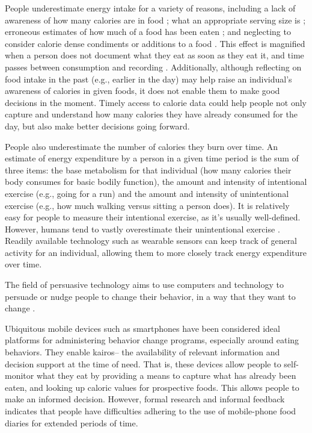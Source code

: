 People underestimate energy intake for a variety of reasons, including a lack of awareness of how many calories are in food \citep{Zegman1984}; what an appropriate serving size is \citep{Young2009, beasley_accuracy_2005}; erroneous estimates of how much of a food has been eaten \citep{beasley_accuracy_2005}; and neglecting to consider calorie dense condiments or additions to a food \citep{Zegman1984}. This effect is magnified when a person does not document what they eat as soon as they eat it, and time passes between consumption and recording \citep{Baranowski1994}. Additionally, although reflecting on food intake in the past (e.g., earlier in the day) may help raise an individual's awareness of calories in given foods, it does not enable them to make good decisions in the moment. Timely access to calorie data could help people not only capture and understand how many calories they have already consumed for the day, but also make better decisions going forward. 

People also underestimate the number of calories they burn over time. An estimate of energy expenditure by a person in a given time period is the sum of three items: the base metabolism for that individual (how many calories their body consumes for basic bodily function), the amount and intensity of intentional exercise (e.g., going for a run) and the amount and intensity of unintentional exercise (e.g., how much walking versus sitting a person does). It is relatively easy for people to measure their intentional exercise, as it's usually well-defined. However, humans tend to vastly overestimate their unintentional exercise \citep{Duncan2001}. Readily available technology such as wearable sensors can keep track of general activity for an individual, allowing them to more closely track energy expenditure over time. 

The field of persuasive technology aims to use computers and technology to persuade or nudge people to change their behavior, in a way that they want to change \citep{Fogg2002}. 

Ubiquitous mobile devices such as smartphones have been considered ideal platforms for administering behavior change programs, especially around eating behaviors. They enable kairos-- the availability of relevant information and decision support at the time of need. That is, these devices allow people to self-monitor what they eat by providing a means to capture what has already been eaten, and looking up caloric values for prospective foods. This allows people to make an informed decision. However, formal research and informal feedback indicates that people have difficulties adhering to the use of mobile-phone food diaries for extended periods of time. 

